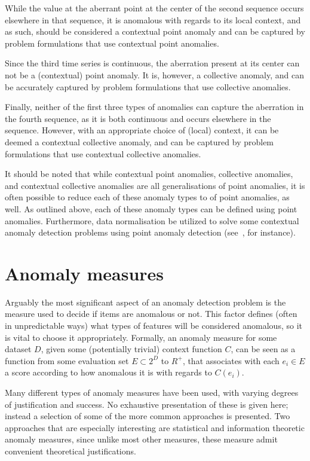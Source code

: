While the value at the aberrant point at the center of the second sequence occurs elsewhere in that sequence, it is anomalous with regards to its local context, and as such, should be considered a contextual point anomaly and can be captured by problem formulations that use contextual point anomalies.

Since the third time series is continuous, the aberration present at its center can not be a (contextual) point anomaly. It is, however, a collective anomaly, and can be accurately captured by problem formulations that use collective anomalies.

Finally, neither of the first three types of anomalies can capture the aberration in the fourth sequence, as it is both continuous and occurs elsewhere in the sequence. However, with an appropriate choice of (local) context, it can be deemed a contextual collective anomaly, and can be captured by problem formulations that use contextual collective anomalies.

It should be noted that while contextual point anomalies, collective anomalies, and contextual collective anomalies are all generalisations of point anomalies, it is often possible to reduce each of these anomaly types to of point anomalies, as well. As outlined above, each of these anomaly types can be defined using point anomalies. Furthermore, data normalisation be utilized to solve some contextual anomaly detection problems using point anomaly detection (see~\cite{meckesheimer}, for instance).

\section{Anomaly measures}
\label{sect:anomaly_measures}

Arguably the most significant aspect of an anomaly detection problem is the measure used to decide if items are anomalous or not. This factor defines (often in unpredictable ways) what types of features will be considered anomalous, so it is vital to choose it appropriately. Formally, an anomaly measure for some dataset $D$, given some (potentially trivial) context function $C$, can be seen as a function from some evaluation set $E \subset 2^D$ to $R^+$, that associates with each $e_i \in E$ a score according to how anomalous it is with regards to $C(e_i)$.

Many different types of anomaly measures have been used, with varying degrees of justification and success. No exhaustive presentation of these is given here; instead a selection of some of the more common approaches is presented. Two approaches that are especially interesting are statistical and information theoretic anomaly measures, since unlike most other measures, these measure admit convenient theoretical justifications.

